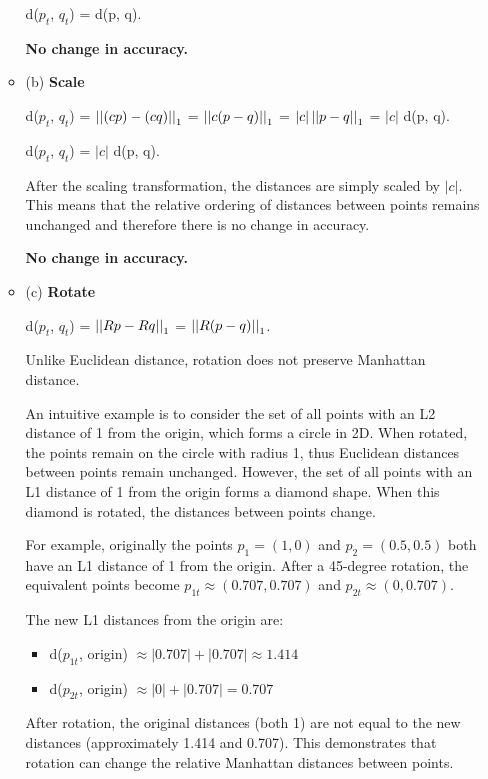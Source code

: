 \documentclass[fleqn]{article}
\begin{document}
\begin{enumerate}
\begin{itemize}
		            d($p_t$, $q_t$) = d(p, q).

		            \textbf{No change in accuracy.}

		      \item (b) \textbf{Scale}

		            d($p_t$, $q_t$) = $\left\vert\left\vert (c p) - (c q) \right\vert\right\vert_1$ = $\left\vert\left\vert c (p - q) \right\vert\right\vert_1$ = $|c| \left\vert\left\vert p - q \right\vert\right\vert_1$ = $|c|$ d(p, q).

		            d($p_t$, $q_t$) = $|c|$ d(p, q).

		            After the scaling transformation, the distances are simply scaled by $|c|$.
		            This means that the relative ordering of distances between points remains unchanged and therefore there is no change in accuracy.

		            \textbf{No change in accuracy.}

		      \item (c) \textbf{Rotate}

		            d($p_t$, $q_t$) = $\left\vert\left\vert R p - R q \right\vert\right\vert_1$ = $\left\vert\left\vert R (p - q) \right\vert\right\vert_1$.

		            Unlike Euclidean distance, rotation does not preserve Manhattan distance.

		            An intuitive example is to consider the set of all points with an L2 distance of 1 from the origin, which forms a circle in 2D.
		            When rotated, the points remain on the circle with radius 1, thus Euclidean distances between points remain unchanged.
		            However, the set of all points with an L1 distance of 1 from the origin forms a diamond shape.
		            When this diamond is rotated, the distances between points change.

		            For example, originally the points $p_1 = (1,0)$ and $p_2 = (0.5,0.5)$ both have an L1 distance of 1 from the origin.
		            After a 45-degree rotation, the equivalent points become $p_{1t} \approx (0.707,0.707)$ and $p_{2t} \approx (0 ,0.707)$.

		            The new L1 distances from the origin are:
		            \begin{itemize}
			            \item d($p_{1t}$, origin) $\approx |0.707| + |0.707| \approx 1.414$
			            \item d($p_{2t}$, origin) $\approx |0| + |0.707| = 0.707$
		            \end{itemize}

		            After rotation, the original distances (both 1) are not equal to the new distances (approximately 1.414 and 0.707).
		            This demonstrates that rotation can change the relative Manhattan distances between points.


\end{itemize}
\end{enumerate}
\end{document}
